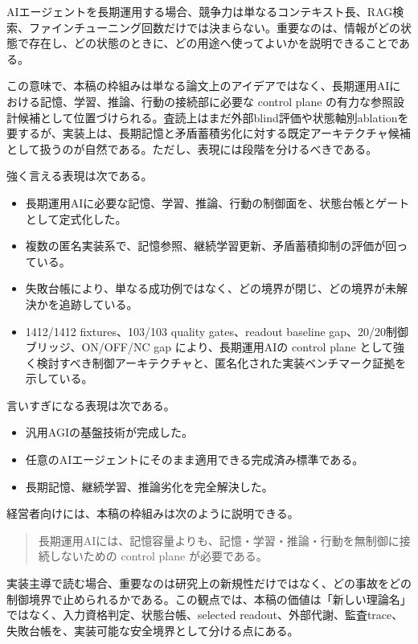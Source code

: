\documentclass[12pt,a4paper]{article}
\begin{document}
AIエージェントを長期運用する場合、競争力は単なるコンテキスト長、RAG検索、ファインチューニング回数だけでは決まらない。重要なのは、情報がどの状態で存在し、どの状態のときに、どの用途へ使ってよいかを説明できることである。

この意味で、本稿の枠組みは単なる論文上のアイデアではなく、長期運用AIにおける記憶、学習、推論、行動の接続部に必要な control plane の有力な参照設計候補として位置づけられる。査読上はまだ外部blind評価や状態軸別ablationを要するが、実装上は、長期記憶と矛盾蓄積劣化に対する既定アーキテクチャ候補として扱うのが自然である。ただし、表現には段階を分けるべきである。

強く言える表現は次である。

\begin{itemize}
\tightlist
\item
  長期運用AIに必要な記憶、学習、推論、行動の制御面を、状態台帳とゲートとして定式化した。
\item
  複数の匿名実装系で、記憶参照、継続学習更新、矛盾蓄積抑制の評価が回っている。
\item
  失敗台帳により、単なる成功例ではなく、どの境界が閉じ、どの境界が未解決かを追跡している。
\item
  1412/1412 fixtures、103/103 quality gates、readout baseline gap、20/20制御ブリッジ、ON/OFF/NC gap により、長期運用AIの control plane として強く検討すべき制御アーキテクチャと、匿名化された実装ベンチマーク証拠を示している。
\end{itemize}

言いすぎになる表現は次である。

\begin{itemize}
\tightlist
\item
  汎用AGIの基盤技術が完成した。
\item
  任意のAIエージェントにそのまま適用できる完成済み標準である。
\item
  長期記憶、継続学習、推論劣化を完全解決した。
\end{itemize}

経営者向けには、本稿の枠組みは次のように説明できる。

\begin{quote}
長期運用AIには、記憶容量よりも、記憶・学習・推論・行動を無制御に接続しないための control plane が必要である。
\end{quote}

実装主導で読む場合、重要なのは研究上の新規性だけではなく、どの事故をどの制御境界で止められるかである。この観点では、本稿の価値は「新しい理論名」ではなく、入力資格判定、状態台帳、selected readout、外部代謝、監査trace、失敗台帳を、実装可能な安全境界として分ける点にある。
\end{document}
